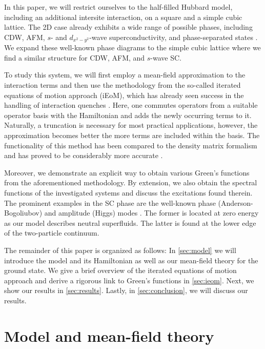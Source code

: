 \documentclass[
    reprint, 
    aps,
    preprintnumbers,
    twocolumn,
    prb,
    superscriptaddress
]{revtex4-2}
\begin{document}
In this paper, we will restrict ourselves to the half-filled Hubbard model, including an additional intersite interaction, on a square and a simple cubic lattice.
The 2D case already exhibits a wide range of possible phases, including CDW, AFM, $s$- and $d_{x^2 - y^2}$-wave superconductivity, and phase-separated states \cite{Micnas88b,Tsuchiura95,Su01,Su04,ha11,Huang13,Jiang22,Linner23}.
We expand these well-known phase diagrams to the simple cubic lattice where we find a similar structure for CDW, AFM, and $s$-wave SC.

To study this system, we will first employ a mean-field approximation to the interaction terms 
and then use the methodology from the so-called iterated equations of motion approach (iEoM),
which has already seen success in the handling of interaction quenches \cite{uhrig09,hamerla13,hamerla14,bleicker18}.
Here, one commutes operators from a suitable operator basis with the Hamiltonian and adds the newly occurring terms to it.
Naturally, a truncation is necessary for most practical applications, however, the approximation becomes better the more terms are included within the basis.
The functionality of this method has been compared to the density matrix formalism and has proved to be considerably more accurate \cite{Kalthoff17}.

Moreover, we demonstrate an explicit way to obtain various Green's functions from the aforementioned methodology.
By extension, we also obtain the spectral functions of the investigated systems and discuss the excitations found therein.
The prominent examples in the SC phase are the well-known phase (Anderson-Bogoliubov) and amplitude (Higgs) modes \cite{Kulik1981,Varma02,Cea14,Measson14,Tsuji15,Krull16,Schwarz20,Fan22}.
The former is located at zero energy as our model describes neutral superfluids.
The latter is found at the lower edge of the two-particle continuum.

The remainder of this paper is organized as follows:
In \autoref{sec:model} we will introduce the model and its Hamiltonian as well as our mean-field theory for the ground state.
We give a brief overview of the iterated equations of motion approach and derive a rigorous link to Green's functions in \autoref{sec:ieom}.
Next, we show our results in \autoref{sec:results}.
Lastly, in \autoref{sec:conclusion}, we will discuss our results.

\section{Model and mean-field theory}\label{sec:model}
\end{document}
